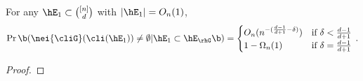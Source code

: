 \begin{lemma}\label{lem:branching}
For any $\hE_1\subset \binom{[n]}{d}$ with $|\hE_1|=O_n(1)$,
\[
    \Pr\b(\nei{\cliG}(\cli(\hE_1))\ne \emptyset | \hE_1\subset \hE_{\rhG}\b) =
    \begin{cases}
        O_n(n^{-(\frac{d-1}{d+1}-\delta)}) &\text{if }\delta<\frac{d-1}{d+1}\\
        1-\Omega_n(1) &\text{if }\delta=\frac{d-1}{d+1}
    \end{cases}
    \,.
\]


\end{lemma}


\begin{proof}

\end{proof}



